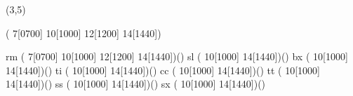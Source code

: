 %
%
%
%
%
%
%

\lhvercheck(3,5)

     \tablevalues               ( 7[0700] 10[1000] 12[1200] 14[1440])

     \makefont\fonttwoletters rm   %
                                (  7[0700] 10[1000] 12[1200] 14[1440])()
     \makefont\fonttwoletters sl   %
                                ( 10[1000] 14[1440])()
     \makefont\fonttwoletters bx   %
                                ( 10[1000] 14[1440])()
     \makefont\fonttwoletters ti   %
                                ( 10[1000] 14[1440])()
     \makefont\fonttwoletters cc   %
                                ( 10[1000] 14[1440])()
     \makefont\fonttwoletters tt   %
                                ( 10[1000] 14[1440])()
     \makefont\fonttwoletters ss   %
                                ( 10[1000] 14[1440])()
     \makefont\fonttwoletters sx   %
                                ( 10[1000] 14[1440])()
